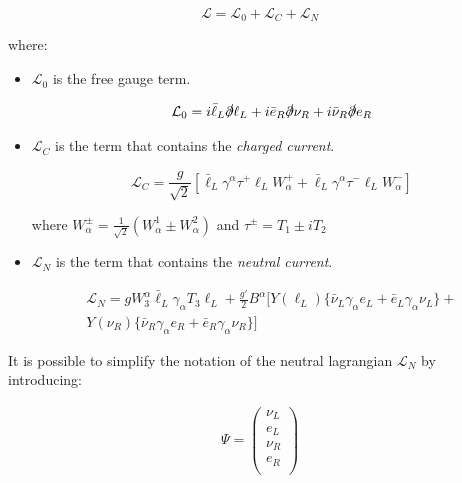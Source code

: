 \begin{equation}
    \mathcal{L} = \mathcal{L}_0 + \mathcal{L}_C + \mathcal{L}_N 
\end{equation}

where:

\begin{itemize}
    \item $\mathcal{L}_0$ is the free gauge term.
    
    \begin{equation}
        \mathcal{L}_0 = i \bar{\ell}_L \slashed{\partial} \ell_L + i \bar{e}_R \slashed{\partial} \nu_R + i \bar{\nu}_R \slashed{\partial} e_R 
    \end{equation}

    \item $\mathcal{L}_C$ is the term that contains the \textit{charged current}.
    
    \begin{equation}
        \mathcal{L}_C = \frac{g}{\sqrt{2}} [\bar{\ell}_L \gamma^{\alpha} \tau^{+} \ell_L W_{\alpha}^+ + \bar{\ell}_L \gamma^{\alpha} \tau^{-} \ell_L W_{\alpha}^-] 
    \end{equation}

    where $W_{\alpha}^{\pm} = \frac{1}{\sqrt{2}}(W^1_{\alpha} \pm W^2_{\alpha})$ and $\tau^{\pm} = T_1 \pm i T_2$

    \item $\mathcal{L}_N$ is the term that contains the \textit{neutral current}.

    \begin{multline}
        \mathcal{L}_N = g W_3^{\alpha} \bar{\ell}_L \gamma_{\alpha} T_3 \ell_L + \frac{g'}{2} B^{\alpha} 
        [Y(\ell_L)\{\bar{\nu}_L \gamma_{\alpha} e_L + \bar{e}_L \gamma_{\alpha} \nu_L\} + \\
        Y(\nu_R)\{\bar{\nu}_R \gamma_{\alpha} e_R + \bar{e}_R \gamma_{\alpha} \nu_R\}]
    \end{multline}

\end{itemize}

It is possible to simplify the notation of the neutral lagrangian $\mathcal{L}_N$ by introducing:

\begin{align}
    \Psi = 
    \begin{pmatrix}
    \nu_L\\
    e_L \\
    \nu_R\\
    e_R \\
    \end{pmatrix}
\end{align}

